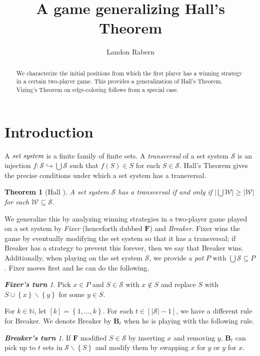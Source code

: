 \documentclass[12pt]{amsart}
\title{A game generalizing Hall's Theorem}
\author{Landon Rabern}
\theoremstyle{plain}
\newtheorem{thm}{Theorem}[section]
\theoremstyle{definition}
\theoremstyle{remark}
\newtheorem*{FixerMove}{\bf {Fixer's turn}}
\newtheorem*{BreakerMove}{\bf {Breaker's turn}}
\newcommand{\fancy}[1]{\mathcal{#1}}
\newcommand{\IN}{\mathbb{N}}
\newcommand{\inj}{\hookrightarrow}
\newcommand{\set}[1]{\left\{ #1 \right\}}
\newcommand{\card}[1]{\left|#1\right|}
\newcommand{\funcinj}[3]{#1\colon #2 \inj #3}
\newcommand{\irange}[1]{\left[#1\right]}
\renewcommand{\S}{\fancy{S}}
\newcommand{\W}{\fancy{W}}
\newcommand{\F}{\mathbf{F}}
\newcommand{\B}{\mathbf{B}}
\begin{document}
\begin{abstract}
We characterize the initial positions from which the first player has a
winning strategy in a certain two-player game.  This provides a generalization
of Hall's Theorem.  Vizing's Theorem on edge-coloring follows from a special case.
\end{abstract}
\maketitle

\section{Introduction}
A $\emph{set system}$ is a finite family of finite sets. A \emph{transversal} of a set system $\S$ is an injection $\funcinj{f}{\S}{\bigcup \S}$ such that $f(S) \in S$ for each $S \in \S$.  Hall's Theorem \cite{hall} gives the precise conditions under which a set system has a transversal.

\begin{thm}[Hall \cite{hall}]
A set system $\S$ has a transversal if and only if $\card{\bigcup \W} \geq \card{\W}$ for each $\W
\subseteq \S$.
\end{thm}

We generalize this by analyzing winning strategies in a two-player game played on a set system  by \emph{Fixer} (henceforth dubbed $\F$) and \emph{Breaker}. Fixer wins the game by eventually modifying the set system so that it has a transversal; if Breaker has a strategy to prevent this forever, then we say that Breaker wins.   Additionally, when playing on the set system $\S$, we provide a \emph{pot} $P$ with $\bigcup \S \subseteq P$. Fixer moves first and he can do the following.

\begin{FixerMove}
Pick $x \in P$ and $S \in \S$ with $x \not \in S$ and replace $S$ with $S
\cup \set{x} \smallsetminus \set{y}$ for some $y \in S$.
\end{FixerMove}

For $k \in \IN$, let $\irange{k} = \set{1, \ldots, k}$. For each $t \in \irange{\card{\S} - 1}$, we have a different rule for Breaker. We denote Breaker by $\B_t$ when he is playing with the following rule.

\begin{BreakerMove}
If $\F$ modified $S \in \S$ by inserting $x$ and removing $y$, $\B_t$ can pick
up to $t$ sets in $\S \smallsetminus \set{S}$ and modify them by
swapping $x$ for $y$ or $y$ for $x$.
\end{BreakerMove}
\end{document}
